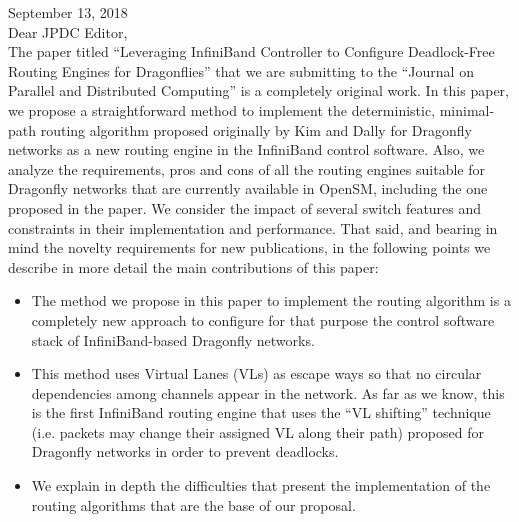 \documentclass[a4paper,10pt]{letter}
\begin{document}

\clearpage
\thispagestyle{empty}

\begin{letter}
\address{German Maglione-Mathey\\ Jesus Escudero-Sahuquillo\\ Pedro Javier Garcia\\ Francisco J. Quiles\\ Eitan Zahavi}

September 13, 2018\\

Dear JPDC Editor, \\

The paper titled ``Leveraging InfiniBand Controller to Configure Deadlock-Free Routing Engines for Dragonflies''
that we are submitting to the ``Journal on Parallel and Distributed Computing'' is a completely original work.
In this paper, we propose a straightforward method to implement the deterministic, minimal-path routing
algorithm proposed originally by Kim and Dally for Dragonfly networks as a new routing engine in the InfiniBand control software.
Also, we analyze the requirements, pros and cons of all the routing engines
suitable for Dragonfly networks that are currently available in OpenSM, including the one proposed in the paper. We consider the impact
of several switch features and constraints in their implementation and performance.
That said, and bearing in mind the novelty requirements for new publications, in the following points we describe in more detail the main contributions of this paper:

\begin{itemize}
\item The method we propose in this paper to implement the routing algorithm is a completely new approach to configure for that purpose the control software stack of InfiniBand-based Dragonfly networks.

\item This method uses Virtual Lanes (VLs) as escape ways so that no circular dependencies among channels appear in the network. As far as we know, this is the first InfiniBand routing engine that uses the ``VL shifting'' technique (i.e. packets may change their assigned VL along their path) proposed for Dragonfly networks in order to prevent deadlocks.

\item We explain in depth the difficulties that present the implementation of the routing algorithms that are the base of our proposal.


\end{itemize}
\end{letter}
\end{document}
